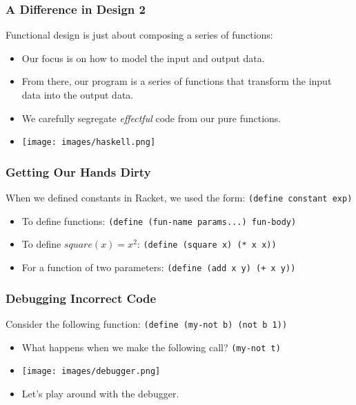 \documentclass{beamer}
\begin{document}
\begin{frame}
  \frametitle{A Difference in Design 2}
  Functional design is just about composing a series of functions:
  \pause
  \begin{itemize}
  \item<2-> Our focus is on how to model the input and output data.
  \item<3-> From there, our program is a series of functions that transform
    the input data into the output data.
  \item<4-> We carefully segregate \emph{effectful} code from our pure functions.
  \item<5-> \texttt{[image: images/haskell.png]}
  \end{itemize}
      
\end{frame}

\begin{frame}
  \frametitle{Getting Our Hands Dirty}
  When we defined constants in Racket, we used the form:
  \texttt{(define constant exp)}
  \begin{itemize}
  \item<2-> To define functions: \texttt{(define (fun-name params...) fun-body)}
  \item<3-> To define $square(x) = x^2$:
    \texttt{(define (square x) (* x x))}
  \item<4-> For a function of two parameters:
    \texttt{(define (add x y) (+ x y))}
  \end{itemize}
\end{frame}

\begin{frame}
  \frametitle{Debugging Incorrect Code}
  Consider the following function:
  \texttt{(define (my-not b) (not b 1))}
  \begin{itemize}
  \item<2-> What happens when we make the following call? \texttt{(my-not t)}
  \item<3-> \texttt{[image: images/debugger.png]}
  \item<4-> Let's play around with the debugger.
  \end{itemize}
\end{frame}
\end{document}
